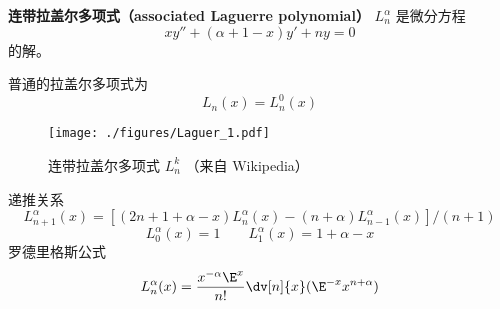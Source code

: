 
\begin{issues}
\issueDraft
\end{issues}

\textbf{连带拉盖尔多项式（associated Laguerre polynomial）} $L_{n}^\alpha$ 是微分方程
\begin{equation}
xy'' + (\alpha + 1 - x) y' + ny = 0
\end{equation}
的解。

普通的拉盖尔多项式为
\begin{equation}
L_n(x) = L_n^0(x)
\end{equation}

\begin{figure}[ht]
\centering
\texttt{[image: ./figures/Laguer\_1.pdf]}
\caption{连带拉盖尔多项式 $L_n^k$ （来自 Wikipedia）} \label{Laguer_fig1}
\end{figure}

递推关系
\begin{equation}
L_{n+1}^\alpha (x) = [(2n + 1 + \alpha  - x)L_n^\alpha (x) - (n + \alpha )L_{n - 1}^\alpha (x)]/(n + 1)
\end{equation}
\begin{equation}
L_0^\alpha (x) = 1
\qquad
L_1^\alpha (x) = 1 + \alpha  - x
\end{equation}  
罗德里格斯公式
\begin{equation}
L_n^\alpha (x) = \frac{x^{-\alpha} \E^x}{n!} \dv[n]{x} (\E^{-x} x^{n+\alpha})
\end{equation}
